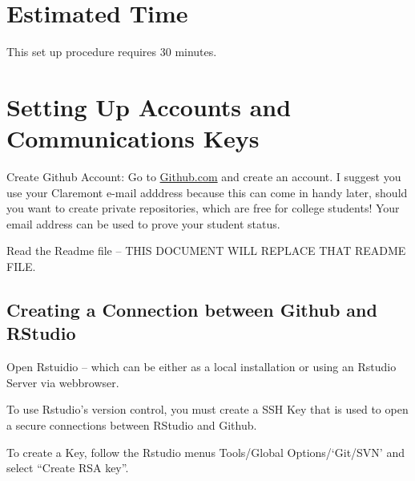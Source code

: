 \documentclass[12pt]{../SOP3_beta}
\begin{document}
\section{Estimated Time}

\NP This set up procedure requires 30 minutes.



\section{Setting Up Accounts and Communications Keys}

\NP Create Github Account: Go to \href{http:\\github.com}{Github.com} and create an account. I suggest you use your Claremont e-mail adddress because this can come in handy later, should you want to create private repositories, which are free for college students! Your email address can be used to prove your student status.
  
\NP Read the Readme file -- THIS DOCUMENT WILL REPLACE THAT README FILE.

\subsection{Creating a Connection between Github and RStudio}

\NP Open Rstuidio -- which can be either as a local installation or using an Rstudio Server via webbrowser.

\NP To use Rstudio's version control, you must create a SSH Key that is used to open a secure connections between RStudio and Github.

\NP To create a Key, follow the Rstudio menus Tools/Global Options/`Git/SVN' and select ``Create RSA key''. 
\end{document}
